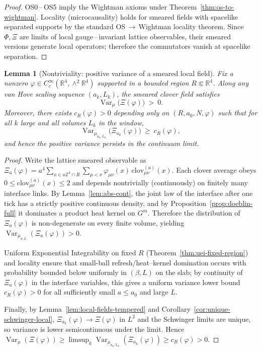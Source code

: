 \documentclass[11pt]{amsart}
\theoremstyle{plain}
\newtheorem{lemma}[theorem]{Lemma}
\theoremstyle{definition}
\theoremstyle{remark}
\begin{document}
\begin{proof}
OS0\,--\,OS5 imply the Wightman axioms under Theorem~\ref{thm:os-to-wightman}. Locality (microcausality) holds for smeared fields with spacelike separated supports by the standard OS\,$\to$\,Wightman locality theorem. Since $\Phi,\Xi$ are limits of local gauge\,--\,invariant lattice observables, their smeared versions generate local operators; therefore the commutators vanish at spacelike separation.
\end{proof}

\begin{lemma}[Nontriviality: positive variance of a smeared local field]\label{lem:nontrivial-variance}
Fix a nonzero $\varphi\in C_c^\infty(\mathbb R^4,\wedge^2\mathbb R^4)$ supported in a bounded region $R\Subset\mathbb R^4$. Along any van Hove scaling sequence $(a_k,L_k)$, the smeared clover field satisfies
\[
  \operatorname{Var}_\mu\big(\Xi(\varphi)\big)\ >\ 0.
\]
Moreover, there exists $c_R(\varphi)>0$ depending only on $(R,a_0,N,\varphi)$ such that for all $k$ large and all volumes $L_k$ in the window,
\[
  \operatorname{Var}_{\mu_{a_k,L_k}}\big(\Xi_{a_k}(\varphi)\big)\ \ge\ c_R(\varphi),
\]
and hence the positive variance persists in the continuum limit.
\end{lemma}

\begin{proof}
Write the lattice smeared observable as $\Xi_a(\varphi)=a^4\sum_{x\in a\mathbb Z^4\cap R} \sum_{\mu<\nu} \varphi_{\mu\nu}(x)\,\mathrm{clov}^{(a)}_{\mu\nu}(x)$. Each clover average obeys $0\le \mathrm{clov}^{(a)}_{\mu\nu}(x)\le 2$ and depends nontrivially (continuously) on finitely many interface links. By Lemma~\ref{lem:abs-cont}, the joint law of the interface after one tick has a strictly positive continuous density, and by Proposition~\ref{prop:doeblin-full} it dominates a product heat kernel on $G^m$. Therefore the distribution of $\Xi_a(\varphi)$ is non-degenerate on every finite volume, yielding $\operatorname{Var}_{\mu_{a,L}}(\Xi_a(\varphi))>0$.

Uniform Exponential Integrability on fixed $R$ (Theorem~\ref{thm:uei-fixed-region}) and locality ensure that small-ball refresh/heat--kernel domination occurs with probability bounded below uniformly in $(\beta,L)$ on the slab; by continuity of $\Xi_a(\varphi)$ in the interface variables, this gives a uniform variance lower bound $c_R(\varphi)>0$ for all sufficiently small $a\le a_0$ and large $L$.

Finally, by Lemma~\ref{lem:local-fields-tempered} and Corollary~\ref{cor:unique-schwinger-local}, $\Xi_{a_k}(\varphi)\to \Xi(\varphi)$ in $L^2$ and the Schwinger limits are unique, so variance is lower semicontinuous under the limit. Hence $\operatorname{Var}_\mu(\Xi(\varphi))\ge \limsup_k \operatorname{Var}_{\mu_{a_k,L_k}}(\Xi_{a_k}(\varphi))\ge c_R(\varphi)>0$.
\end{proof}
\end{document}
